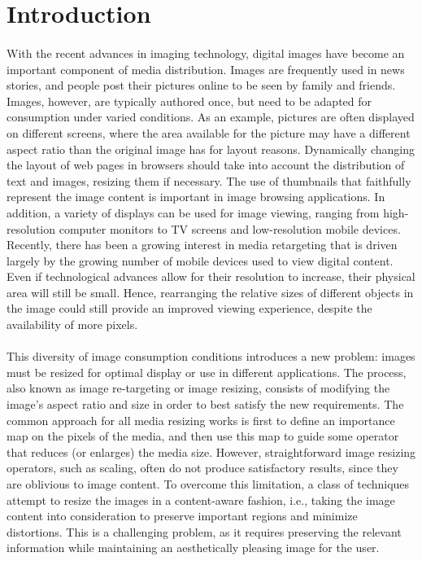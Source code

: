 \documentclass[conference]{acmsiggraph}
\begin{document}
\TOGlinkslist


\copyrightspace

\section{Introduction}

\paragraph{}
With the recent advances in imaging technology, digital images have become an important component of media distribution. Images are frequently used in news stories, and people post their pictures online to be seen by family and friends. Images, however, are typically authored once, but need to be adapted for consumption under varied conditions. As an example, pictures are often displayed on different screens, where the area available for the picture may have a different aspect ratio than the original image has for layout reasons. Dynamically changing the layout of web pages in browsers should take into account the distribution of text and images, resizing them if necessary. The use of thumbnails that faithfully represent the image content is important in image browsing applications. In addition, a variety of displays can be used for image viewing, ranging from high-resolution computer monitors to TV screens and low-resolution mobile devices. Recently, there has been a growing interest in media retargeting that is driven largely by the growing number of mobile devices used to view digital content. Even if technological advances allow for their resolution to increase, their physical area will still be small. Hence, rearranging the relative sizes of different objects in the image could still provide an improved viewing experience, despite the availability of more pixels.

\paragraph{}
This diversity of image consumption conditions introduces a new problem: images must be resized for optimal display or use in different applications. The process, also known as image re-targeting or image resizing, consists of modifying the image's aspect ratio and size in order to best satisfy the new requirements.  The common approach for all media resizing works is first to define an importance map on the pixels of the media, and then use this map to guide some operator that reduces (or enlarges) the media size. However, straightforward image resizing operators, such as scaling, often do not produce satisfactory results, since they are oblivious to image content. To overcome this limitation, a class of techniques attempt to resize the images in a content-aware fashion, i.e., taking the image content into consideration to preserve important regions and minimize distortions. This is a challenging problem, as it requires preserving the relevant information while maintaining an aesthetically pleasing image for the user.
\end{document}
